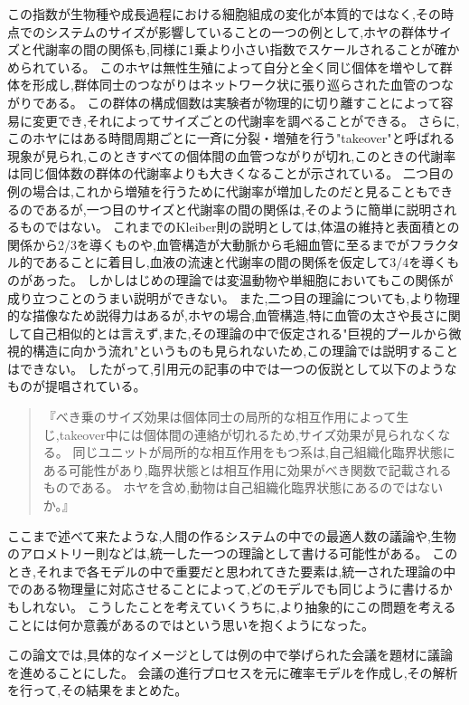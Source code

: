 この指数が生物種や成長過程における細胞組成の変化が本質的ではなく,その時点でのシステムのサイズが影響していることの一つの例として,ホヤの群体サイズと代謝率の間の関係も,同様に1乗より小さい指数でスケールされることが確かめられている\cite{self-organization}。
このホヤは無性生殖によって自分と全く同じ個体を増やして群体を形成し,群体同士のつながりはネットワーク状に張り巡らされた血管のつながりである。
この群体の構成個数は実験者が物理的に切り離すことによって容易に変更でき,それによってサイズごとの代謝率を調べることができる。
さらに,このホヤにはある時間周期ごとに一斉に分裂・増殖を行う"takeover"と呼ばれる現象が見られ,このときすべての個体間の血管つながりが切れ,このときの代謝率は同じ個体数の群体の代謝率よりも大きくなることが示されている。
二つ目の例の場合は,これから増殖を行うために代謝率が増加したのだと見ることもできるのであるが,一つ目のサイズと代謝率の間の関係は,そのように簡単に説明されるものではない。
これまでのKleiber則の説明としては,体温の維持と表面積との関係から2/3を導くものや,血管構造が大動脈から毛細血管に至るまでがフラクタル的であることに着目し,血液の流速と代謝率の間の関係を仮定して3/4を導くものがあった。
しかしはじめの理論では変温動物や単細胞においてもこの関係が成り立つことのうまい説明ができない。
また,二つ目の理論についても,より物理的な描像なため説得力はあるが,ホヤの場合,血管構造,特に血管の太さや長さに関して自己相似的とは言えず,また,その理論の中で仮定される"巨視的プールから微視的構造に向かう流れ"というものも見られないため,この理論では説明することはできない。
したがって,引用元の記事の中では一つの仮説として以下のようなものが提唱されている。

\begin{quote}
『べき乗のサイズ効果は個体同士の局所的な相互作用によって生じ,takeover中には個体間の連絡が切れるため,サイズ効果が見られなくなる。
同じユニットが局所的な相互作用をもつ系は,自己組織化臨界状態にある可能性があり,臨界状態とは相互作用に効果がべき関数で記載されるものである。
ホヤを含め,動物は自己組織化臨界状態にあるのではないか。』
\end{quote}

ここまで述べて来たような,人間の作るシステムの中での最適人数の議論や,生物のアロメトリー則などは,統一した一つの理論として書ける可能性がある。
このとき,それまで各モデルの中で重要だと思われてきた要素は,統一された理論の中でのある物理量に対応させることによって,どのモデルでも同じように書けるかもしれない。
こうしたことを考えていくうちに,より抽象的にこの問題を考えることには何か意義があるのではという思いを抱くようになった。

この論文では,具体的なイメージとしては例の中で挙げられた会議を題材に議論を進めることにした。
会議の進行プロセスを元に確率モデルを作成し,その解析を行って,その結果をまとめた。
